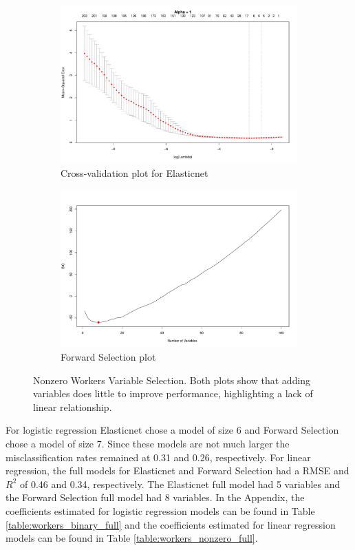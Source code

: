 \documentclass{article}
\begin{document}
\begin{figure}[h]
\begin{subfigure}[b]{0.5\textwidth}
\includegraphics[width=\textwidth]{elastic_cv_workers_nonzero.pdf}
\caption{Cross-validation plot for Elasticnet}
\end{subfigure}
\hfill
\begin{subfigure}[b]{0.5\textwidth}
\includegraphics[width=\textwidth]{forward_nvars_workers_nonzero.pdf}
\caption{Forward Selection plot}
\end{subfigure}
\caption{Nonzero Workers Variable Selection. Both plots show that adding variables does little to improve performance, highlighting a lack of linear relationship.}
\label{figure:workers_nonzero_opt}
\end{figure}

For logistic regression Elasticnet chose a model of size 6 and Forward Selection chose a model of size 7. Since these 
models are not much larger the misclassification rates remained at 0.31 and 0.26, respectively. For linear regression, the full 
models for Elasticnet and Forward Selection had a RMSE and $R^2$ of 0.46 and 0.34, respectively. The Elasticnet full model 
had 5 variables and the Forward Selection full model had 8 variables.  In the Appendix, the coefficients estimated for logistic 
regression models can be found in Table \ref{table:workers_binary_full} and the coefficients estimated for linear regression 
models can be found in Table \ref{table:workers_nonzero_full}. 
\end{document}
